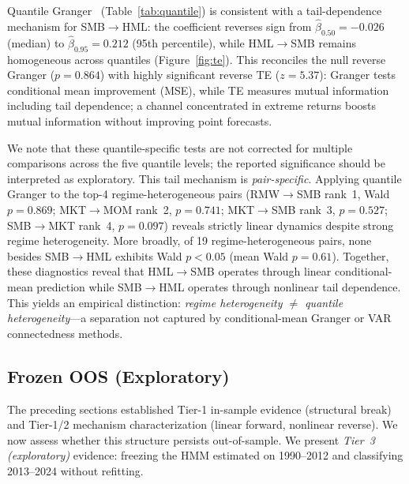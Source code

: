 \documentclass[sigconf,anonymous]{acmart}
\begin{document}
Quantile Granger~\cite{troster2019testing} (Table~\ref{tab:quantile})
is consistent with a tail-dependence mechanism for SMB$\to$HML:
the coefficient reverses sign from $\hat{\beta}_{0.50} = -0.026$ (median) to
$\hat{\beta}_{0.95} = 0.212$ (95th percentile), while HML$\to$SMB
remains homogeneous across quantiles (Figure~\ref{fig:te}).
This reconciles the null reverse Granger ($p = 0.864$)
with highly significant reverse TE ($z = 5.37$): Granger tests conditional
mean improvement (MSE), while TE measures mutual information including
tail dependence; a channel concentrated in extreme returns boosts mutual information
without improving point forecasts.

We note that these quantile-specific tests are not corrected for
multiple comparisons across the five quantile levels; the reported
significance should be interpreted as exploratory.
This tail mechanism is \emph{pair-specific}.
Applying quantile Granger to the top-4 regime-heterogeneous pairs
(RMW$\to$SMB rank~1, Wald $p = 0.869$; MKT$\to$MOM rank~2, $p = 0.741$;
MKT$\to$SMB rank~3, $p = 0.527$;
SMB$\to$MKT rank~4, $p = 0.097$) reveals strictly linear dynamics despite
strong regime heterogeneity. More broadly, of 19 regime-heterogeneous
pairs, none besides SMB$\to$HML exhibits Wald $p < 0.05$
(mean Wald $p = 0.61$). Together, these diagnostics reveal that HML$\to$SMB operates through
linear conditional-mean prediction while SMB$\to$HML operates through
nonlinear tail dependence. This yields an empirical distinction:
\emph{regime heterogeneity $\neq$ quantile heterogeneity}---a separation
not captured by conditional-mean Granger or VAR connectedness methods.

\subsection{Frozen OOS (Exploratory)}
\label{sec:oos}

The preceding sections established Tier-1 in-sample evidence
(structural break) and Tier-1/2 mechanism characterization
(linear forward, nonlinear reverse). We now assess whether this
structure persists out-of-sample. We present \emph{Tier~3
(exploratory)} evidence: freezing the HMM estimated on 1990--2012
and classifying 2013--2024 without refitting.
\end{document}
